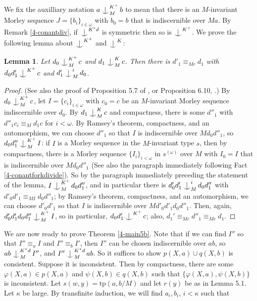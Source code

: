\documentclass[12pt]{amsart}
\newtheorem{lemma}[theorem]{Lemma}
\theoremstyle{definition}
\def\Ind#1#2{#1\setbox0=\hbox{$#1x$}\kern\wd0\hbox to 0pt{\hss$#1\mid$\hss}
\lower.9\ht0\hbox to 0pt{\hss$#1\smile$\hss}\kern\wd0}
\def\ind{\mathop{\mathpalette\Ind{}}}
\begin{document}
We fix the auxilliary notation $a\ind_{M}^{K^{+}}b$ to mean that there is an $M$-invariant Morley sequence $J = \{b_{i}\}_{i\in \omega}$ with $b_{0}=b$ that is indiscernible over $Ma$. By Remark \ref{4-conantdiv}, if $\ind^{K^{*}d}$ is symmetric then so is $\ind^{K^{+}}$. We prove the following lemma about $\ind^{K^{+}}$ and $\ind^{K}$:

\begin{lemma}\label{4-wit5}
   Let $d_{0} \ind^{K^{+}}_{M} c$ and $d_{1} \ind^{K}_{M} c$. Then there is $d'_{1} \equiv_{Mc} d_{1}$ with $d_{0}d'_{1} \ind^{K^{+}} c$ and $d'_{1} \ind^{i}_{M} d_{0}$.
\end{lemma}

\begin{proof}


    (See also the proof of Proposition 5.7 of \cite{NSOP2}, or Proposition 6.10, \cite{KR17}.) 
    By $d_{0} \ind^{K^{+}}_{M} c$, let $I=\{c_{i}\}_{i \in \omega}$ with $c_{0} = c$ be an $M$-invariant Morley sequence indiscernible over $d_{0}$. By $d_{1} \ind^{K}_{M} c$ and compactness, there is some $d''_{1}$ with $d''_{1} c_{i} \equiv_{M} d_{1}c$ for $i < \omega$. By Ramsey's theorem, compactness, and an automorphism, we can choose $d''_{1}$ so that $I$ is indiscernible over $Md_{0}d''_{1}$, so $d_{0}d''_{1}\ind^{K^{+}}_{M} I$: if $I$ is a Morley sequence in the $M$-invariant type $s$, then by compactness, there is a Morley sequence $\{I_{i}\}_{i < \omega}$ in $s^{(\omega)}$ over $M$ with $I_{0} = I$ that is indiscernible over $Md_{0}d''_{1}$ (See also the paragraph immediately following Fact \ref{4-conantforkdivide}). So by the paragraph immediately preceding the statement of the lemma, $I \ind^{K^{+}}_{M} d_{0}d''_{1}$, and in particular there is $d'_{0}d'_{1} \ind^{i}_{M} d_{0}d''_{1}$ with $d'_{0}d'_{1} \equiv_{MI} d_{0}d''_{1}$; by Ramsey's theorem, compactness, and an automorphism, we can choose $d'_{0}d'_{1}$ so that $I$ is indiscernible over $Md'_{0}d'_{1}d_{0}d''_{1}$. Then, again, $d'_{0}d'_{1}d_{0}d''_{1} \ind^{K^{+}}_{M} I$, so in particular,  $d_{0}d'_{1} \ind^{K^{+}} c$; also, $d_{1}' \equiv_{Mc} d''_{1} \equiv_{Mc} d_{1}$.
\end{proof}

We are now ready to prove Theorem \ref{4-main5b}. Note that if we can find $I''$ so that $I'' \equiv_{a} I$ and $I'' \equiv_{b} I'$, then $I''$ can be chosen indiscernible over $ab$, so $ab \ind^{K^{*}d}_{M}I''$, and $I'' \ind^{K^{*}d}_{M} ab$. So it suffices to show $p(X, a) \cup q(X, b)$ is consistent. Suppose it is inconsistent. Then by compactness, there are some $\varphi(X, a) \in p(X, a)$ and $\psi(X, b) \in q(X, b)$ such that $\{\varphi(X, a), \psi(X, b)\}$ is inconsistent. Let $s(w, y) = \mathrm{tp} (a,b/M)$ and let $r(y)$ be as in Lemma 5.1. Let $\kappa$ be large. By transfinite induction, we will find $a_{i}, b_{i}$, $i < \kappa$ such that
\end{document}
